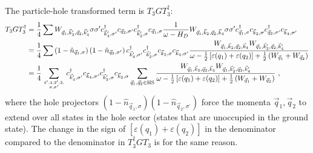 \documentclass{revtex4-2}
\begin{document}
The particle-hole transformed term is \(T_3 G T_3^\dagger\):
\begin{equation}\begin{aligned}
	T_3 G T_3^\dagger &= \frac{1}{4}\sum  W_{\vec q_1,\vec k_2^\prime, \vec q_2, \vec k_4^\prime} \sigma\sigma^\prime c^\dagger_{\vec k^\prime_4,\sigma^\prime} c_{\vec q_2,\sigma^\prime} c^\dagger_{\vec k^\prime_2,\sigma} c_{\vec q_1,\sigma}\frac{1}{\omega - H_D}W_{\vec q_1,\vec k_2, \vec q_2, \vec k_4} \sigma\sigma^\prime c^\dagger_{\vec q_1,\sigma}c_{\vec k_2,\sigma}c^\dagger_{\vec q_2,\sigma^\prime}c_{\vec k_4,\sigma^\prime} \\
			  &= \frac{1}{4}\sum \left(1 - \hat n_{\vec q_1,\sigma}\right) \left(1 - \hat n_{\vec q_2,\sigma^\prime}\right) c^\dagger_{\vec k^\prime_4,\sigma^\prime} c^\dagger_{\vec k^\prime_2,\sigma}  c_{\vec k_2,\sigma} c_{\vec k_4,\sigma^\prime}\frac{W_{\vec q_1,\vec k_2, \vec q_2, \vec k_4} W_{\vec q_1,\vec k_2^\prime, \vec q_2, \vec k_4^\prime}}{\omega - \frac{1}{2}\left[\varepsilon(q_1) + \varepsilon(q_2)\right] + \frac{1}{2}\left(W_{\vec q_1} + W_{\vec q_2}\right)}\\
			  &= \frac{1}{4}\sum_{4^\prime,4,2^\prime,2,\atop{\sigma,\sigma^\prime}} c^\dagger_{\vec k^\prime_4,\sigma^\prime}  c_{\vec k_4,\sigma^\prime} c^\dagger_{\vec k^\prime_2,\sigma}  c_{\vec k_2,\sigma} \sum_{\vec q_1, \vec q_2 \in \text{HS}}\frac{W_{\vec q_1,\vec k_2, \vec q_2, \vec k_4} W_{\vec q_1,\vec k_2^\prime, \vec q_2, \vec k_4^\prime}}{\omega - \frac{1}{2}\left[\varepsilon(q_1) + \varepsilon(q_2)\right] + \frac{1}{2}\left(W_{\vec q_1} + W_{\vec q_2}\right)}~,
\end{aligned}\end{equation}
where the hole projectors \(\left(1 - \hat n_{\vec q_1,\sigma}\right) \left(1 - \hat n_{\vec q_2,\sigma^\prime}\right)\) force the momenta \(\vec q_1,\vec q_2\) to extend over all states in the hole sector (states that are unoccupied in the ground state). The change in the sign of \(\left[\varepsilon(q_1) + \varepsilon(q_2)\right]\) in the denominator compared to the denominator in \(T_3^\dagger G T_3\) is for the same reason.
\end{document}
